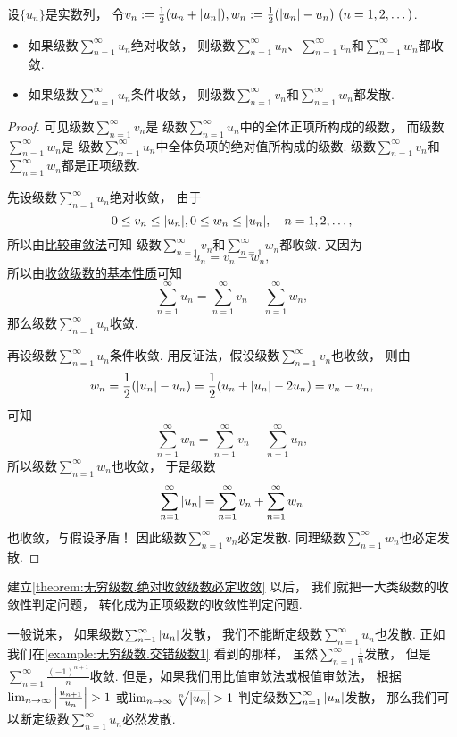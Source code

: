 \begin{theorem}\label{theorem:无穷级数.绝对收敛级数必定收敛}
设\(\{u_n\}\)是实数列，
令\(v_n := \frac12 (u_n + \abs{u_n}),
w_n := \frac12 (\abs{u_n} - u_n)
\ (n=1,2,\dotsc)\).
\begin{itemize}
	\item 如果级数\(\sum_{n=1}^\infty u_n\)绝对收敛，
	则级数\(\sum_{n=1}^\infty u_n\)、\(\sum_{n=1}^\infty v_n\)和\(\sum_{n=1}^\infty w_n\)都收敛.

	\item 如果级数\(\sum_{n=1}^\infty u_n\)条件收敛，
	则级数\(\sum_{n=1}^\infty v_n\)和\(\sum_{n=1}^\infty w_n\)都发散.
\end{itemize}
\begin{proof}
可见级数\(\sum_{n=1}^\infty v_n\)是
级数\(\sum_{n=1}^\infty u_n\)中的全体正项所构成的级数，
而级数\(\sum_{n=1}^\infty w_n\)是
级数\(\sum_{n=1}^\infty u_n\)中全体负项的绝对值所构成的级数.
级数\(\sum_{n=1}^\infty v_n\)和\(\sum_{n=1}^\infty w_n\)都是正项级数.

先设级数\(\sum_{n=1}^\infty u_n\)绝对收敛，
由于\[
	0 \leq v_n \leq \abs{u_n},
	0 \leq w_n \leq \abs{u_n},
	\quad n=1,2,\dotsc,
\]
所以由\hyperref[theorem:无穷级数.正项级数的比较审敛法]{比较审敛法}可知
级数\(\sum_{n=1}^\infty v_n\)和\(\sum_{n=1}^\infty w_n\)都收敛.
又因为\[
	u_n = v_n - w_n,
\]
所以由\hyperref[theorem:无穷级数.收敛级数性质2]{收敛级数的基本性质}可知\[
	\sum_{n=1}^\infty u_n
	= \sum_{n=1}^\infty v_n
	- \sum_{n=1}^\infty w_n,
\]
那么级数\(\sum_{n=1}^\infty u_n\)收敛.

再设级数\(\sum_{n=1}^\infty u_n\)条件收敛.
用反证法，假设级数\(\sum_{n=1}^\infty v_n\)也收敛，
则由\[
	w_n = \frac12 (\abs{u_n} - u_n)
	= \frac12 (u_n + \abs{u_n} - 2 u_n)
	= v_n - u_n,
\]可知\[
	\sum_{n=1}^\infty w_n
	= \sum_{n=1}^\infty v_n
	- \sum_{n=1}^\infty u_n,
\]
所以级数\(\sum_{n=1}^\infty w_n\)也收敛，
于是级数\[
	\sum_{n=1}^\infty \abs{u_n}
	= \sum_{n=1}^\infty v_n
	+ \sum_{n=1}^\infty w_n
\]也收敛，与假设矛盾！
因此级数\(\sum_{n=1}^\infty v_n\)必定发散.
同理级数\(\sum_{n=1}^\infty w_n\)也必定发散.
\end{proof}
\end{theorem}

建立\cref{theorem:无穷级数.绝对收敛级数必定收敛} 以后，
我们就把一大类级数的收敛性判定问题，
转化成为正项级数的收敛性判定问题.

一般说来，
如果级数\(\sum_{n=1}^\infty \abs{u_n}\)发散，
我们不能断定级数\(\sum_{n=1}^\infty u_n\)也发散.
正如我们在\cref{example:无穷级数.交错级数1} 看到的那样，
虽然\(\sum_{n=1}^\infty \frac{1}{n}\)发散，
但是\(\sum_{n=1}^\infty \frac{(-1)^{n+1}}{n}\)收敛.
但是，如果我们用比值审敛法或根值审敛法，
根据\(\lim_{n\to\infty} \abs{\frac{u_{n+1}}{u_n}} > 1\)
或\(\lim_{n\to\infty} \sqrt[n]{\abs{u_n}} > 1\)
判定级数\(\sum_{n=1}^\infty \abs{u_n}\)发散，
那么我们可以断定级数\(\sum_{n=1}^\infty u_n\)必然发散.


